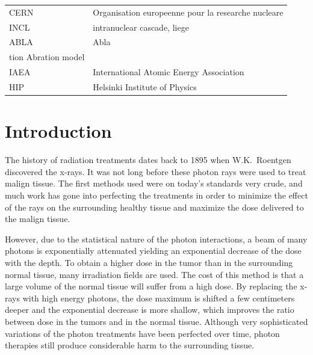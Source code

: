 \tableofcontents



\begin{tabular}{ll}
CERN         & Organisation europeenne pour la researche nucleare \\
INCL      & intranuclear cascade, liege\\
ABLA        & Abla \\tion Abration model\\
IAEA         & International Atomic Energy Association \\
HIP        & Helsinki Institute of Physics
\end{tabular}


\cleardoublepage
\storeinipagenumber
{}
\setcounter{page}{1}


\section{Introduction}
\thispagestyle{empty}
The history of radiation treatments dates back to 1895 when W.K.~Roentgen discovered the x-rays. It was not long before these photon rays were used to treat malign tissue. The first methods used were on today's standards very crude, and much work has gone into perfecting the treatments in order to minimize the effect of the rays on the surrounding healthy tissue and maximize the dose delivered to the malign tissue.

However, due to the statistical nature of the photon interactions, a beam of many photons is
exponentially attenuated yielding an exponential decrease of the dose with the depth. To
obtain a higher dose in the tumor than in the surrounding normal tissue, many irradiation
fields are used. The cost of this method is that a large volume of the normal tissue
will suffer from a high dose. By replacing the x-rays with high energy photons, the dose
maximum is shifted a few centimeters deeper and the exponential decrease is more shallow,
which improves the ratio between dose in the tumors and in the normal tissue. Although very sophisticated variations of the photon treatments have been perfected over time, photon therapies still produce considerable harm to the surrounding tissue. 

